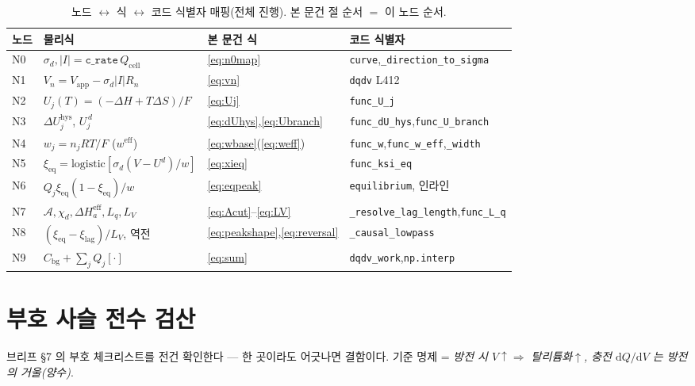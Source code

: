 \documentclass[11pt,a4paper]{article}
\newcommand{\dd}{\mathrm{d}}
\newcommand{\eff}{\mathrm{eff}}
\newcommand{\eq}{\mathrm{eq}}
\newcommand{\app}{\mathrm{app}}
\newcommand{\cell}{\mathrm{cell}}
\newcommand{\bg}{\mathrm{bg}}
\newcommand{\hys}{\mathrm{hys}}
\newcommand{\code}[1]{\texttt{#1}}
\begin{document}
\begin{table}[t]
\centering
\renewcommand{\arraystretch}{1.3}
\caption{노드 $\leftrightarrow$ 식 $\leftrightarrow$ 코드 식별자 매핑(전체 진행). 본 문건 절 순서 $=$ 이 노드 순서.}
\label{tab:nodemap}
\begin{tabular}{l l l l}
\toprule
노드 & 물리식 & 본 문건 식 & 코드 식별자 \\
\midrule
N0 & $\sigma_d,|I|=\code{c\_rate}\,Q_\cell$ & \eqref{eq:n0map} & \code{curve},\code{\_direction\_to\_sigma} \\
N1 & $V_n=V_\app-\sigma_d|I|R_n$ & \eqref{eq:vn} & \code{dqdv} L412 \\
N2 & $U_j(T)=(-\Delta H+T\Delta S)/F$ & \eqref{eq:Uj} & \code{func\_U\_j} \\
N3 & $\Delta U_j^\hys$, $U_j^{\,d}$ & \eqref{eq:dUhys},\eqref{eq:Ubranch} & \code{func\_dU\_hys},\code{func\_U\_branch} \\
N4 & $w_j=n_jRT/F$ ($w^\eff$) & \eqref{eq:wbase}(\eqref{eq:weff}) & \code{func\_w},\code{func\_w\_eff},\code{\_width} \\
N5 & $\xi_\eq=\mathrm{logistic}[\sigma_d(V-U^d)/w]$ & \eqref{eq:xieq} & \code{func\_ksi\_eq} \\
N6 & $Q_j\xi_\eq(1-\xi_\eq)/w$ & \eqref{eq:eqpeak} & \code{equilibrium}, 인라인 \\
N7 & $\mathcal A,\chi_d,\Delta H_a^\eff,L_q,L_V$ & \eqref{eq:Acut}--\eqref{eq:LV} & \code{\_resolve\_lag\_length},\code{func\_L\_q} \\
N8 & $(\xi_\eq-\xi_\mathrm{lag})/L_V$, 역전 & \eqref{eq:peakshape},\eqref{eq:reversal} & \code{\_causal\_lowpass} \\
N9 & $C_\bg+\sum_jQ_j[\cdot]$ & \eqref{eq:sum} & \code{dqdv\_work},\code{np.interp} \\
\bottomrule
\end{tabular}
\end{table}

\section{부호 사슬 전수 검산}\label{sec:signcheck}
브리프 §7 의 부호 체크리스트를 전건 확인한다 — 한 곳이라도 어긋나면 결함이다. 기준 명제 = \emph{방전 시
$V\!\uparrow\Rightarrow$ 탈리튬화$\uparrow$, 충전 $\dd Q/\dd V$ 는 방전의 거울(양수)}.
\end{document}
